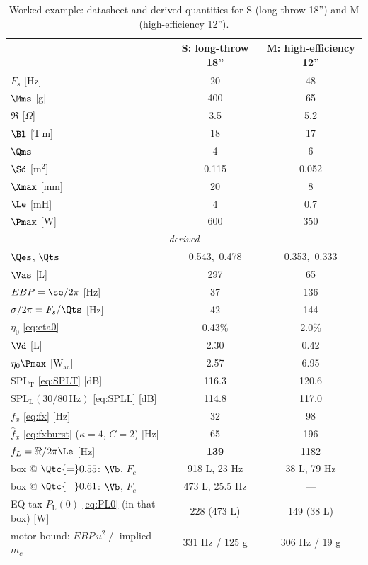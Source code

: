 \begin{table}[htbp]
\centering
\caption{Worked example: datasheet and derived quantities for S (long-throw 18'') and M (high-efficiency 12'').}
\label{tab:worked-example}
\begin{tabular}{lcc}
\toprule
 & S: long-throw 18'' & M: high-efficiency 12''\\
\midrule
$F_s$ [Hz] & 20 & 48\\
$\Mms$ [g] & 400 & 65\\
$\Re$ [$\Omega$] & 3.5 & 5.2\\
$\Bl$ [T\,m] & 18 & 17\\
$\Qms$ & 4 & 6\\
$\Sd$ [m$^2$] & 0.115 & 0.052\\
$\Xmax$ [mm] & 20 & 8\\
$\Le$ [mH] & 4 & 0.7\\
$\Pmax$ [W] & 600 & 350\\
\midrule
\multicolumn{3}{c}{\emph{derived}}\\
\midrule
$\Qes$, $\Qts$ & 0.543,\ 0.478 & 0.353,\ 0.333\\
$\Vas$ [L] & 297 & 65\\
$EBP=\se/2\pi$ [Hz] & 37 & 136\\
$\sigma/2\pi=F_s/\Qts$ [Hz] & 42 & 144\\
$\eta_0$ \eqref{eq:eta0} & 0.43\% & 2.0\%\\
$\Vd$ [L] & 2.30 & 0.42\\
$\eta_0\Pmax$ [W$_{\mathrm{ac}}$] & 2.57 & 6.95\\
$\mathrm{SPL_T}$ \eqref{eq:SPLT} [dB] & 116.3 & 120.6\\
$\mathrm{SPL_L}(30/80\,\mathrm{Hz})$ \eqref{eq:SPLL} [dB] & 114.8 & 117.0\\
$f_x$ \eqref{eq:fx} [Hz] & 32 & 98\\
$\hat f_x$ \eqref{eq:fxburst} ($\kappa{=}4$, $C{=}2$) [Hz] & 65 & 196\\
$f_L=\Re/2\pi\Le$ [Hz] & \textbf{139} & 1182\\
box @ $\Qtc{=}0.55$: $\Vb$, $F_c$ & 918 L, 23 Hz & 38 L, 79 Hz\\
box @ $\Qtc{=}0.61$: $\Vb$, $F_c$ & 473 L, 25.5 Hz & ---\\
EQ tax $P_{\mathrm{L}}(0)$ \eqref{eq:PL0} (in that box) [W] & 228 (473 L) & 149 (38 L)\\
motor bound: $EBP\,u^2\;/\;$ implied $m_c$ & 331 Hz / 125 g & 306 Hz / 19 g\\
\bottomrule
\end{tabular}
\end{table}

